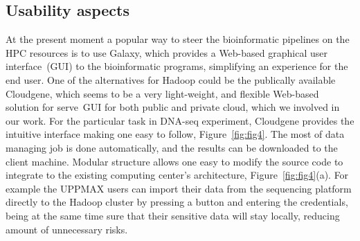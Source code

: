 \documentclass[11pt, oneside]{article}   	%
\begin{document}
\subsection{Usability aspects}
\label{subsectionIV_2}

At the present moment a popular way to steer the bioinformatic pipelines on the HPC resources  is to use Galaxy\cite{galaxy}, which provides a Web-based graphical user interface~(GUI) to the bioinformatic programs, simplifying an experience for the end user. 
One of the alternatives for Hadoop could be the publically available Cloudgene\cite{cloudgene}, which seems to be a very light-weight, and flexible Web-based solution for serve~GUI for both public and private cloud, which we involved in our work.
For the particular task in DNA-seq experiment, Cloudgene provides the intuitive interface making one easy to follow, Figure~\ref{fig:fig4}. The most of data managing job is done automatically, and the results can be downloaded to the client machine. Modular structure allows one easy to modify the source code to integrate to the existing computing center’s architecture, Figure~\ref{fig:fig4}(a). For example the UPPMAX users can import their data from the sequencing platform directly to the Hadoop cluster by pressing a button and entering the credentials, being at the same time sure that their sensitive data will stay locally, reducing amount of unnecessary risks.
\end{document}
